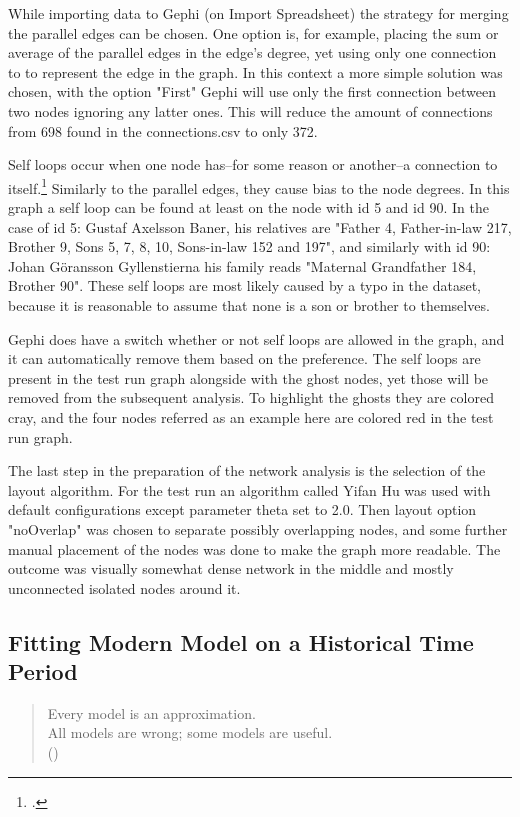 While importing data to Gephi (on Import Spreadsheet) the strategy for merging the parallel edges can be chosen. One option is, for example, placing the sum or average of the parallel edges in the edge's degree, yet using only one connection to to represent the edge in the graph. In this context a more simple solution was chosen, with the option "First" Gephi will use only the first connection between two nodes ignoring any latter ones. This will reduce the amount of connections from 698 found in the connections.csv to only 372.

Self loops occur when one node has–for some reason or another–a connection to itself.\footcite[p. 13.]{RajPM2018} Similarly to the parallel edges, they cause bias to the node degrees. In this graph a self loop can be found at least on the node with id 5 and id 90. In the case of id 5: Gustaf Axelsson Baner, his relatives are "Father 4, Father-in-law 217, Brother 9, Sons 5, 7, 8, 10, Sons-in-law 152 and 197", and similarly with id 90: Johan Göransson Gyllenstierna his family reads "Maternal Grandfather 184, Brother 90". These self loops are most likely caused by a typo in the dataset, because it is reasonable to assume that none is a son or brother to themselves.
 
Gephi does have a switch whether or not self loops are allowed in the graph, and it can automatically remove them based on the preference. The self loops are present in the test run graph alongside with the ghost nodes, yet those will be removed from the subsequent analysis. To highlight the ghosts they are colored cray, and the four nodes referred as an example here are colored red in the test run graph.

The last step in the preparation of the network analysis is the selection of the layout algorithm. For the test run an algorithm called Yifan Hu was used with default configurations except parameter theta set to 2.0. Then layout option "noOverlap" was chosen to separate possibly overlapping nodes, and some further manual placement of the nodes was done to make the graph more readable. The outcome was visually somewhat dense network in the middle and mostly unconnected isolated nodes around it. 

\subsection{Fitting Modern Model on a Historical Time Period}
\label{background}
\begin{quote}
	Every model is an approximation.\\
	All models are wrong; some models are useful.\\
	(\cite[prefix]{statisticsfor})
\end{quote}

